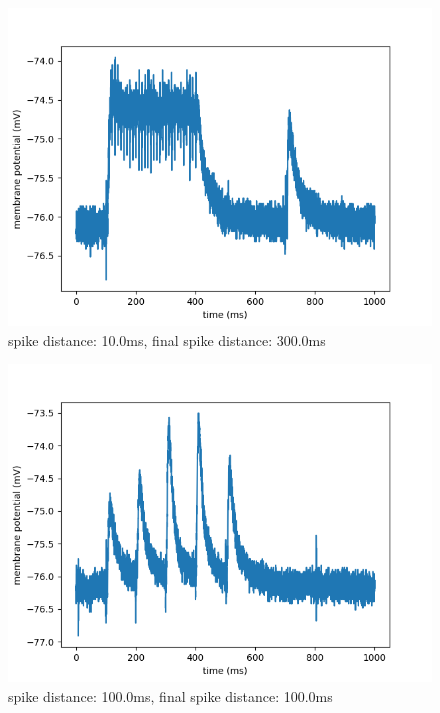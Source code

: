 \documentclass[10pt,a4paper]{scrartcl}
\begin{document}
\begin{figure} [ht]
\begin{center}
\label{fig:abb13}
\caption{spike distance: 10.0ms, final spike distance: 300.0ms}
\includegraphics[scale=0.35]{pictures/final_spike_variation_3.pdf} 
\end{center}
\end{figure}

\begin{figure} [ht]
\begin{center}
\label{fig:abb14}
\caption{spike distance: 100.0ms, final spike distance: 100.0ms}
\includegraphics[scale=0.35]{pictures/final_spike_variation_4.pdf} 
\end{center}
\end{figure}
\end{document}
